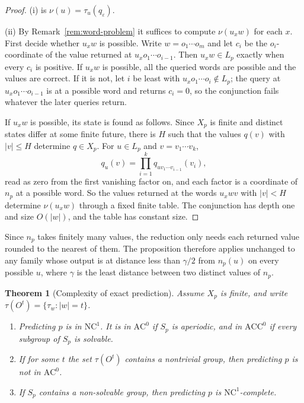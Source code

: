 \documentclass[10pt]{article}
\newtheorem{theorem}{Theorem}[section]
\theoremstyle{definition}
\theoremstyle{remark}
\newcommand{\Obs}{O}
\newcommand{\eps}{\varepsilon}
\begin{document}
\begin{proof}
(i) is $\nu(u)=\tau_u(q_\eps)$.

(ii) By Remark~\ref{rem:word-problem} it suffices to compute
$\nu(u_xw)$ for each $x$.  First decide whether $u_xw$ is possible.
Write $w=o_1\cdots o_m$ and let $c_i$ be the $o_i$-coordinate of the
value returned at $u_xo_1\cdots o_{i-1}$.  Then $u_xw\in L_p$ exactly
when every $c_i$ is positive.  If $u_xw$ is possible, all the queried
words are possible and the values are correct.  If it is not, let $i$
be least with $u_xo_1\cdots o_i\notin L_p$; the query at
$u_xo_1\cdots o_{i-1}$ is at a possible word and returns $c_i=0$, so
the conjunction fails whatever the later queries return.

If $u_xw$ is possible, its state is found as follows.  Since $X_p$ is
finite and distinct states differ at some finite future, there is $H$
such that the values $q(v)$ with $|v|\le H$ determine $q\in X_p$.
For $u\in L_p$ and $v=v_1\cdots v_k$,
\[
  q_u(v)=\prod_{i=1}^{k}q_{uv_1\cdots v_{i-1}}(v_i),
\]
read as zero from the first vanishing factor on, and each factor is
a coordinate of $n_p$ at a possible word.  So the values returned at
the words $u_xwv$ with $|v|<H$ determine $\nu(u_xw)$ through a fixed
finite table.  The conjunction has depth one and size $O(|w|)$, and
the table has constant size.
\end{proof}

Since $n_p$ takes finitely many values, the reduction only needs each
returned value rounded to the nearest of them.  The proposition
therefore applies unchanged to any family whose output is at
distance less than
$\gamma/2$ from $n_p(u)$ on every possible $u$, where $\gamma$ is the
least distance between two distinct values of $n_p$.

\begin{theorem}[Complexity of exact prediction]
\label{thm:pred-complexity}
Assume $X_p$ is finite, and write
$\tau(\Obs^t)=\{\tau_w:|w|=t\}$.
\begin{enumerate}[label=(\roman*)]
  \item Predicting $p$ is in $\mathrm{NC}^1$.  It is in
        $\mathrm{AC}^0$ if $S_p$ is aperiodic, and in
        $\mathrm{ACC}^0$ if every subgroup of $S_p$ is solvable.
  \item If for some $t$ the set $\tau(\Obs^t)$ contains a nontrivial
        group, then predicting $p$ is not in $\mathrm{AC}^0$.
  \item If $S_p$ contains a non-solvable group, then predicting $p$
        is $\mathrm{NC}^1$-complete.
\end{enumerate}
\end{theorem}
\end{document}
